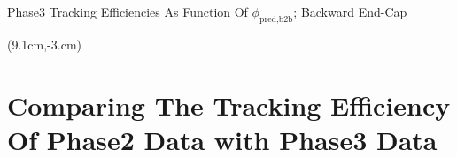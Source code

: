 \documentclass[8pt]{beamer}
\begin{document}
\begin{frame}{Phase3 Tracking Efficiencies As Function Of $\phi_{\textrm{pred,b2b}}$; Backward End-Cap}
	
			\begin{textblock*}{5cm}(9.1cm,-3.cm)
	\end{textblock*}
	
	\pause[4]
	
	
	
\end{frame}




\section{Comparing The Tracking Efficiency Of Phase2 Data with Phase3 Data}
\end{document}
